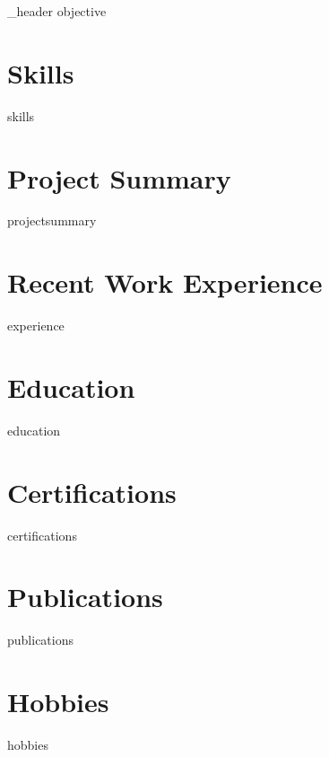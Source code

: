 \documentclass[letter,10pt]{article}
\author{YourName} %
\begin{document}
{_header}
{objective}

\section{Skills}
{skills}

\section{Project Summary}
{projectsummary}

\section{Recent Work Experience}
{experience}

\section{Education}
{education}

\section{Certifications}
{certifications}

\section{Publications}
{publications}

\section{Hobbies}
{hobbies}
\end{document}
